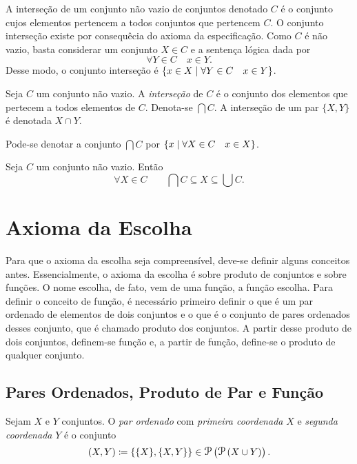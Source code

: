 A interseção de um conjunto não vazio de conjuntos denotado $C$ é o conjunto cujos elementos pertencem a todos conjuntos que pertencem $C$. O conjunto interseção existe por consequêcia do axioma da especificação. Como $C$ é não vazio, basta considerar um conjunto $X \in C$ e a sentença lógica dada por
	\begin{equation*}
	\forall Y \in C \quad x \in Y.
	\end{equation*}
Desse modo, o conjunto interseção é $\left\{x \in X \;\middle\vert\; \forall Y \in C \quad x \in Y \right\}$.

\begin{defi}
Seja $C$ um conjunto não vazio. A \emph{interseção} de $C$ é o conjunto dos elementos que pertecem a todos elementos de $C$. Denota-se $\bigcap C$. A interseção de um par $\{X,Y\}$ é denotada $X \cap Y$.
\end{defi}

Pode-se denotar a conjunto $\bigcap C$ por $\left\{x \;\middle\vert\; \forall X \in C \quad x \in X \right\}$.

\begin{prop}
Seja $C$ um conjunto não vazio. Então
	\begin{equation*}
	\forall X \in C \qquad \bigcap C \subseteq X \subseteq \bigcup C.
	\end{equation*}
\end{prop}

\section{Axioma da Escolha}

Para que o axioma da escolha seja compreensível, deve-se definir alguns conceitos antes. Essencialmente, o axioma da escolha é sobre produto de conjuntos e sobre funções. O nome escolha, de fato, vem de uma função, a função escolha. Para definir o conceito de função, é necessário primeiro definir o que é um par ordenado de elementos de dois conjuntos e o que é o conjunto de pares ordenados desses conjunto, que é chamado produto dos conjuntos. A partir desse produto de dois conjuntos, definem-se função e, a partir de função, define-se o produto de qualquer conjunto.

\subsection*{Pares Ordenados, Produto de Par e Função}

\begin{defi}
Sejam $X$ e $Y$ conjuntos. O \emph{par ordenado} com \emph{primeira coordenada} $X$ e \emph{segunda coordenada} $Y$ é o conjunto
	\begin{equation*}
	(X,Y) \coloneqq \{\{X\},\{X,Y\}\} \in \p\left(\p\left(X \cup Y\right)\right).
	\end{equation*}
\end{defi}

